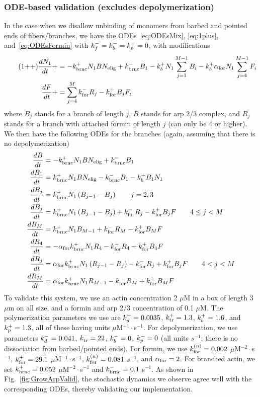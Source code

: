 \documentclass[11pt]{article}
\begin{document}
\subsubsection{ODE-based validation (excludes depolymerization)}
In the case when we disallow unbinding of monomers from barbed and pointed ends of fibers/branches, we have the ODEs\ \eqref{eq:ODEsMix}, \eqref{eq:1plus}, and\ \eqref{eq:ODEsFormin} with $k_f^-=k_b^-=k_p^-=0$, with modifications
\begin{align*}
\label{eq:1plusplus}
\tag{1++}
\frac{dN_1}{dt} +&=-k_\text{brnc}^+ N_1 B N_\text{elig}+k_\text{brnc}^- B_1 -k_b^+ N_1 \sum_{j=1}^{M-1}  B_i -k_b^+ \alpha_\text{for} N_1 \sum_{j=4}^{M-1} F_i \\
\frac{d F}{dt} +&= \sum_{j=4}^{M} k_\text{for}^- R_j - k_\text{for}^+ B_j F,
\end{align*}
where $B_j$ stands for a branch of length $j$, $B$ stands for arp 2/3 complex, and $R_j$ stands for a branch with attached formin of length $j$ (can only be 4 or higher). We then have the following ODEs for the branches (again, assuming that there is no depolymerization)
\begin{subequations}
\label{eq:ODEsBrOnly}
\begin{align}
\frac{dB}{dt} &= -k_\text{brnc}^+ N_1 B N_\text{elig}+k_\text{brnc}^- B_1 \\
\frac{d B_1}{dt } &= k_\text{brnc}^+ N_1 B N_\text{elig}- k_\text{brnc}^- B_1 -k_b^+ B_1 N_1 \\
\frac{d B_j}{dt } & = k_\text{brnc}^+ N_1 \left(B_{j-1}-B_j\right) \qquad j=2,3\\
\frac{d B_j}{dt} & = k_\text{brnc}^+ N_1 \left(B_{j-1}-B_j\right)+k_\text{for}^- R_j - k_\text{for}^+ B_j F \qquad 4 \leq j < M\\
\frac{d B_M}{dt} & = k_\text{brnc}^+ N_1 B_{M-1}+k_\text{for}^- R_M - k_\text{for}^+ B_M F\\
\frac{d R_4}{dt} & = -\alpha_\text{for} k_\text{brnc}^+ N_1 R_4 -k_\text{for}^- R_4 + k_\text{for}^+ B_4 F \\
\frac{d R_j}{dt} & = \alpha_\text{for} k_\text{brnc}^+ N_1 \left(R_{j-1}-R_j\right)-k_\text{for}^- R_j + k_\text{for}^+ B_j F \qquad 4 < j < M\\
\frac{d R_M}{dt} & = \alpha_\text{for} k_\text{brnc}^+ N_1 R_{M-1}-k_\text{for}^- R_M + k_\text{for}^+ B_M F
\end{align}
\end{subequations}
To validate this system, we use an actin concentration 2 $\mu$M in a box of length 3 $\mu$m on all size, and a formin and arp 2/3 concentration of 0.1 $\mu$M. The polymerization parameters we use are $k_d^+=0.0035$, $k_\text{tr}^+=1.3$, $k_b^+=1.6$, and $k_p^+=1.3$, all of these having units $\mu$M$^{-1}\cdot$s$^{-1}$. For depolymerization, we use parameters $k_d^- = 0.041$, $k_\text{tr}^- = 22$, $k_b^-=0$, $k_p^-=0$ (all units $s^{-1}$; there is no dissociation from barbed/pointed ends). For formin, we use $k_\text{for}^{(n)} = 0.002$ $\mu$M$^{-2}\cdot$s$^{-1}$, $k_\text{for}^+ = 29.1$ $\mu$M$^{-1}\cdot$s$^{-1}$, $k_\text{for}^{(n)} = 0.081$ $s^{-1}$, and $\alpha_\text{for}=2$. For branched actin, we set $k_\text{brnc}^+=0.052$ $\mu$M$^{-2}\cdot$s$^{-1}$ and $k_\text{brnc}^-=0.1$ s$^{-1}$. As shown in Fig.\ \ref{fig:GrowArpValid}, the stochastic dynamics we observe agree well with the corresponding ODEs, thereby validating our implementation.
\end{document}
